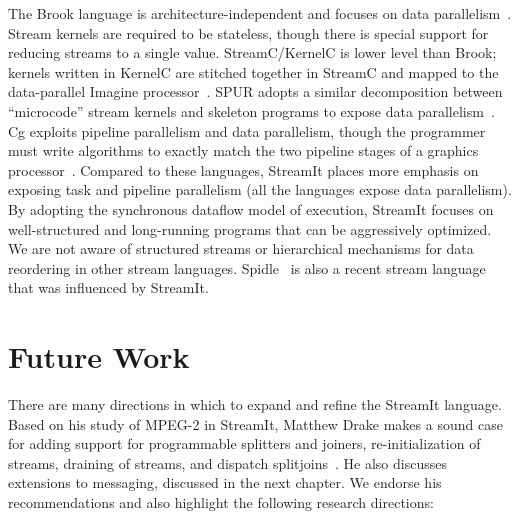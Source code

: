The Brook language is architecture-independent and focuses on data
parallelism~\cite{brook04}.  Stream kernels are required to be
stateless, though there is special support for reducing streams to a
single value.  Stream\-C/Ker\-nel\-C is lower level than Brook;
kernels written in KernelC are stitched together in StreamC and mapped
to the data-parallel Imagine processor~\cite{imagine03ieee}.  SPUR
adopts a similar decomposition between ``microcode'' stream kernels
and skeleton programs to expose data parallelism~\cite{spur05samos}.
Cg exploits pipeline parallelism and data parallelism, though the
programmer must write algorithms to exactly match the two pipeline
stages of a graphics processor~\cite{cg03}.  Compared to these
languages, StreamIt places more emphasis on exposing task and pipeline
parallelism (all the languages expose data parallelism).
By adopting the synchronous dataflow model of execution, StreamIt
focuses on well-structured and long-running programs that can be
aggressively optimized.  We are not aware of structured streams or
hierarchical mechanisms for data reordering in other stream languages.
Spidle~\cite{spidle03} is also a recent stream language that was
influenced by StreamIt.

\section{Future Work}

There are many directions in which to expand and refine the StreamIt
language.  Based on his study of MPEG-2 in StreamIt, Matthew Drake
makes a sound case for adding support for programmable splitters and
joiners, re-initialization of streams, draining of streams, and
dispatch splitjoins~\cite{drake-thesis}.  He also discusses extensions
to messaging, discussed in the next chapter.  We endorse his
recommendations and also highlight the following research directions:


